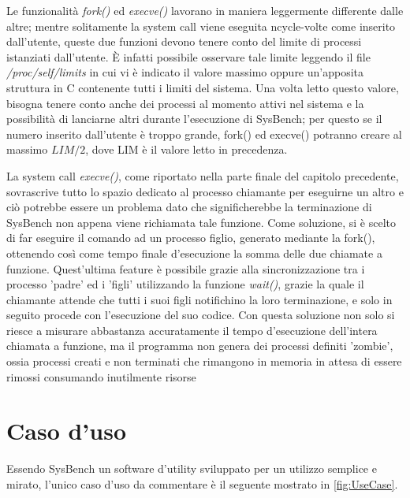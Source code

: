 Le funzionalità \emph{fork()} ed \emph{execve()} lavorano in maniera leggermente differente dalle altre; mentre solitamente la system call viene eseguita ncycle-volte come inserito dall'utente, queste due funzioni devono tenere conto del limite di processi istanziati dall'utente. È infatti possibile osservare tale limite leggendo il file \emph{/proc/self/limits} in cui vi è indicato il valore massimo oppure un'apposita struttura in C contenente tutti i limiti del sistema. Una volta letto questo valore, bisogna tenere conto anche dei processi al momento attivi nel sistema e la possibilità di lanciarne altri durante l'esecuzione di SysBench; per questo se il numero inserito dall'utente è troppo grande, fork() ed execve() potranno creare al massimo $ LIM / 2$, dove LIM è il valore letto in precedenza.

La system call \emph{execve()}, come riportato nella parte finale del capitolo precedente, sovrascrive tutto lo spazio dedicato al processo chiamante per eseguirne un altro e ciò potrebbe essere un problema dato che significherebbe la terminazione di SysBench non appena viene richiamata tale funzione. Come soluzione, si è scelto di far eseguire il comando ad un processo figlio, generato mediante la fork(), ottenendo così come tempo finale d'esecuzione la somma delle due chiamate a funzione. Quest'ultima feature è possibile grazie alla sincronizzazione tra i processo 'padre' ed i 'figli' utilizzando la funzione \emph{wait()}, grazie la quale il chiamante attende che tutti i suoi figli notifichino la loro terminazione, e solo in seguito procede con l'esecuzione del suo codice. Con questa soluzione non solo si riesce a misurare abbastanza accuratamente il tempo d'esecuzione dell'intera chiamata a funzione, ma il programma non genera dei processi definiti 'zombie', ossia processi creati e non terminati che rimangono in memoria in attesa di essere rimossi consumando inutilmente risorse

\section{Caso d'uso}

Essendo SysBench un software d'utility sviluppato per un utilizzo semplice e mirato, l'unico caso d'uso da commentare è il seguente mostrato in \autoref{fig:UseCase}.

